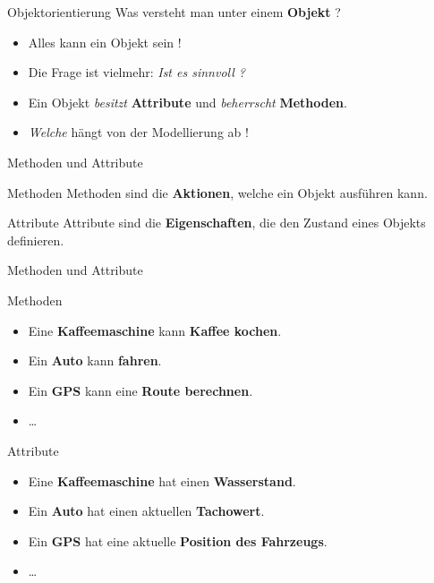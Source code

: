 \documentclass[18pt]{beamer}
\begin{document}
\begin{frame}{Objektorientierung}
    Was versteht man unter einem \textbf{Objekt} ?
    \begin{itemize}
        \item Alles kann ein Objekt sein !
        \item Die Frage ist vielmehr: \textit{Ist es sinnvoll ?}
        \item Ein Objekt \textit{besitzt} \textbf{Attribute} und \textit{beherrscht} \textbf{Methoden}.
        \item \textit{Welche} hängt von der Modellierung ab !
    \end{itemize}
\end{frame}

\begin{frame}{Methoden und Attribute}
    \begin{block}{Methoden}
        Methoden sind die \textbf{Aktionen}, welche ein Objekt ausführen kann.
    \end{block}

    \begin{block}{Attribute}
        Attribute sind die \textbf{Eigenschaften}, die den Zustand eines Objekts definieren.
    \end{block}
\end{frame}

\begin{frame}{Methoden und Attribute}
    \begin{exampleblock}{Methoden}
        \begin{itemize}
            \item Eine \textbf{Kaffeemaschine} kann \textbf{Kaffee kochen}.
            \item Ein \textbf{Auto} kann \textbf{fahren}.
            \item Ein \textbf{GPS} kann eine \textbf{Route berechnen}.
            \item \dots
        \end{itemize}
    \end{exampleblock}
    \begin{exampleblock}{Attribute}
        \begin{itemize}
            \item Eine \textbf{Kaffeemaschine} hat einen \textbf{Wasserstand}.
            \item Ein \textbf{Auto} hat einen aktuellen \textbf{Tachowert}.
            \item Ein \textbf{GPS} hat eine aktuelle \textbf{Position des Fahrzeugs}.
            \item \dots
        \end{itemize}
    \end{exampleblock}
\end{frame}
\end{document}
